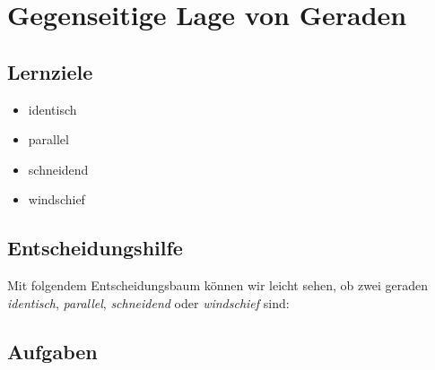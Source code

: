 \section{Gegenseitige Lage von Geraden}

\subsection*{Lernziele}
\begin{itemize}
\item identisch
\item parallel
\item schneidend
\item windschief
\end{itemize}


\subsection{Entscheidungshilfe}
Mit folgendem Entscheidungsbaum können wir leicht sehen, ob zwei
geraden \textit{identisch}, \textit{parallel}, \textit{schneidend}
oder \textit{windschief} sind:



\subsection*{Aufgaben}

